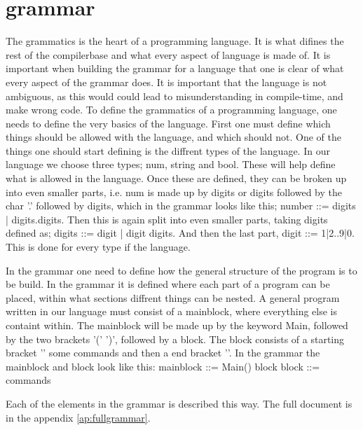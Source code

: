 \section{grammar}
The grammatics is the heart of a programming language. It is what difines the rest of the compilerbase and what every aspect of language is made of.
It is important when building the grammar for a language that one is clear of what every aspect of the grammar does. It is important that the language is not ambiguous, as this would could lead to misunderstanding in compile-time, and make wrong code.
To define the grammatics of a programming language, one needs to define the very basics of the language. First one must define which things should be allowed with the language, and which should not.
One of the things one should start defining is the diffrent types of the language. In our language we choose three types; num, string and bool. These will help define what is allowed in the language. Once these are defined, they can be broken up into even smaller parts, i.e. num is made up by digits or digits followed by the char '.' followed by digits, which in the grammar looks like this; number ::= digits | digits.digits.
Then this is again split into even smaller parts, taking digits defined as; digits ::= digit | digit digits. And then the last part, digit ::= 1|2..9|0. This is done for every type if the language.

In the grammar one need to define how the general structure of the program is to be build. In the grammar it is defined where each part of a program can be placed, within what sections diffrent things can be nested. A general program written in our language must consist of a mainblock, where everything else is containt within. The mainblock will be made up by the keyword Main, followed by the two brackets '(' ')', followed by a block.
The block consists of a starting bracket '{' some commands and then a end bracket '}'. In the grammar the mainblock and block look like this: mainblock ::= Main() block
block ::= { commands }

Each of the elements in the grammar is described this way. The full document is in the appendix \ref{ap:fullgrammar}.